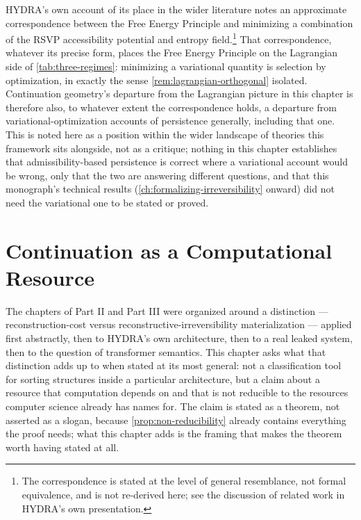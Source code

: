 \documentclass[11pt]{book}
\theoremstyle{plain}
\theoremstyle{definition}
\theoremstyle{remark}
\begin{document}
HYDRA's own account of its place in the wider literature notes an
approximate correspondence between the Free Energy Principle and
minimizing a combination of the RSVP accessibility potential and
entropy field.\footnote{The correspondence is stated at the level of
general resemblance, not formal equivalence, and is not re-derived
here; see the discussion of related work in HYDRA's own
presentation.} That correspondence, whatever its precise form, places
the Free Energy Principle on the Lagrangian side of
\cref{tab:three-regimes}: minimizing a variational quantity is
selection by optimization, in exactly the sense
\cref{rem:lagrangian-orthogonal} isolated. Continuation geometry's
departure from the Lagrangian picture in this chapter is therefore
also, to whatever extent the correspondence holds, a departure from
variational-optimization accounts of persistence generally, including
that one. This is noted here as a position within the wider landscape
of theories this framework sits alongside, not as a critique; nothing
in this chapter establishes that admissibility-based persistence is
correct where a variational account would be wrong, only that the two
are answering different questions, and that this monograph's
technical results (\cref{ch:formalizing-irreversibility} onward) did
not need the variational one to be stated or proved.
\chapter{Continuation as a Computational Resource}
\label{ch:continuation-as-resource}

The chapters of Part II and Part III were organized around a
distinction --- reconstruction-cost versus reconstructive-irreversibility
materialization --- applied first abstractly, then to HYDRA's own
architecture, then to a real leaked system, then to the question of
transformer semantics. This chapter asks what that distinction adds
up to when stated at its most general: not a classification tool for
sorting structures inside a particular architecture, but a claim about
a resource that computation depends on and that is not reducible to
the resources computer science already has names for. The claim is
stated as a theorem, not asserted as a slogan, because
\cref{prop:non-reducibility} already contains everything the proof
needs; what this chapter adds is the framing that makes the theorem
worth having stated at all.
\end{document}
